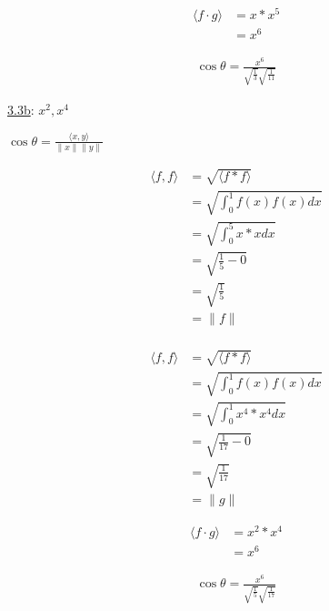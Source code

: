 \documentclass{article}
\begin{document}
\begin{equation}
  \begin{split}
  \langle f \cdot g \rangle & = x * x^5\\
  & = x^6
  \end{split}
\end{equation}

\begin{equation}
  \begin{split}
  \cos \theta = \frac{x^6}{\sqrt{\frac{1}{3}}\sqrt{\frac{1}{11}}}
  \end{split}
\end{equation}

\underline{3.3b}: $x^2, x^4$

$\cos\theta =\frac{\langle x,y \rangle}{ \| x\| \|y\|} $

\begin{equation}
  \begin{split}
  \langle f,f \rangle & = \sqrt{\langle f * f \rangle}\\
  & = \sqrt{\int_{0}^{1} f(x)f(x) dx}\\
  & = \sqrt{\int_{0}^{5} x * x dx}\\
  & = \sqrt{\frac{1}{5} - 0}\\
  & = \sqrt{\frac{1}{5}}\\
  & = \| f \|\\
  \end{split}
\end{equation}

\begin{equation}
  \begin{split}
  \langle f,f \rangle & = \sqrt{\langle f * f \rangle}\\
  & = \sqrt{\int_{0}^{1} f(x)f(x) dx}\\
  & = \sqrt{\int_{0}^{1} x^{4} * x^{4} dx}\\
  & = \sqrt{\frac{1}{17} - 0}\\
  & = \sqrt{\frac{1}{17}} \\
  & = \| g \|
  \end{split}
\end{equation}

\begin{equation}
  \begin{split}
  \langle f \cdot g \rangle & = x^2 * x^4\\
  & = x^6
  \end{split}
\end{equation}

\begin{equation}
  \begin{split}
  \cos \theta = \frac{x^6}{\sqrt{\frac{1}{5}}\sqrt{\frac{1}{17}}}
  \end{split}
\end{equation}
\end{document}
